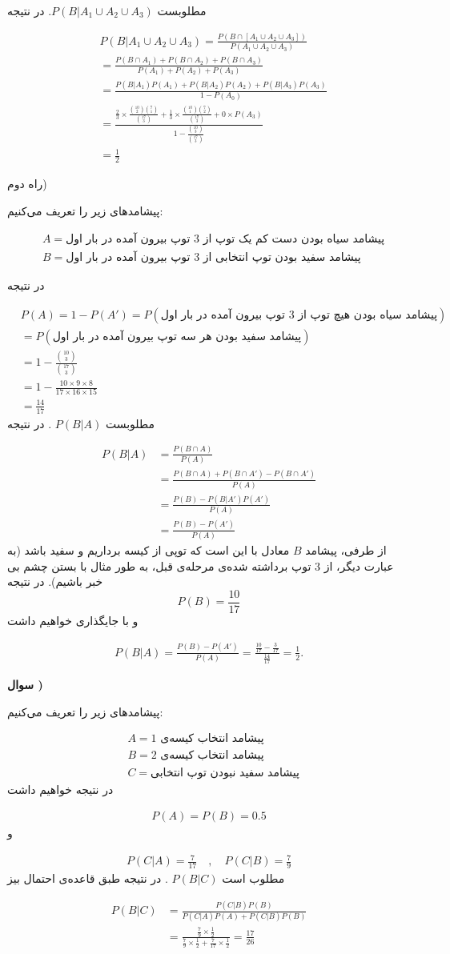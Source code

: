 \documentclass{article}
\newcounter{questionnumber}
\newcommand{\Q}{
\textbf{سوال \thequestionnumber)}
\stepcounter{questionnumber}
}
\newcommand{\eqn}[1]{
\begin{equation}\begin{split}
#1
\end{split}\end{equation}
}
\begin{document}
مطلوبست
$
P(B|A_1\cup A_2\cup A_3)
$.
در نتیجه
\eqn{
&
P(B|A_1\cup A_2\cup A_3)
=
\frac{
P(B\cap[A_1\cup A_2\cup A_3])
}{
P(A_1\cup A_2\cup A_3)
}
\\&=
\frac{
P(B\cap A_1)+P(B\cap A_2)+P(B\cap A_3)
}{
P(A_1)+P(A_2)+P(A_3)
}
\\&=
\frac{
P(B|A_1)P(A_1)+P(B|A_2)P(A_2)+P(B|A_3)P(A_3)
}{
1-P(A_0)
}
\\&=
\frac{
\frac{2}{3}\times \frac{\binom{10}{2}\binom{7}{1}}{\binom{17}{3}}+
\frac{1}{3}\times \frac{\binom{10}{1}\binom{7}{2}}{\binom{17}{3}}+0\times P(A_3)
}{
1-\frac{\binom{10}{3}}{\binom{17}{3}}
}
\\&=\frac{1}{2}
}{}

راه دوم)

پیشامدهای زیر را تعریف می‌کنیم:
\eqn{
&
A=\text{
پیشامد سیاه بودن دست کم یک توپ از 3 توپ بیرون آمده در بار اول
}
\\&
B=\text{
پیشامد سفید بودن توپ انتخابی از 3 توپ بیرون آمده در بار اول
}
}{}

در نتیجه
\eqn{
&P(A)=1-P(A')=P(\text{
پیشامد سیاه بودن هیچ توپ از 3 توپ بیرون آمده در بار اول
})
\\&=
P(\text{
پیشامد سفید بودن هر سه توپ بیرون آمده در بار اول
})
\\&=
1-\frac{\binom{10}{3}}{\binom{17}{3}}
\\&=
1-\frac{10\times 9\times 8}{17\times 16\times 15}
\\&=
\frac{14}{17}
}{}
مطلوبست
$
P(B|A)
$
. در نتیجه
\eqn{
P(B|A)&=\frac{P(B\cap A)}{P(A)}
\\&=\frac{P(B\cap A)+P(B\cap A')-P(B\cap A')}{P(A)}
\\&=\frac{P(B)-P(B|A')P(A')}{P(A)}
\\&=\frac{P(B)-P(A')}{P(A)}
}{}
از طرفی، پیشامد $B$ معادل با این است که توپی از کیسه برداریم و سفید باشد (به عبارت دیگر، از 3 توپ برداشته شده‌ی مرحله‌ی قبل، به طور مثال با بستن چشم بی خبر باشیم). در نتیجه
$$
P(B)=\frac{10}{17}
$$
و با جایگذاری خواهیم داشت
\eqn{
P(B|A)=\frac{P(B)-P(A')}{P(A)}
=\frac{\frac{10}{17}-\frac{3}{17}}{\frac{14}{17}}=\frac{1}{2}.
}{}















\Q

پیشامدهای زیر را تعریف می‌کنیم:
\eqn{
&
A=\text{
پیشامد انتخاب کیسه‌ی 1
}
\\&
B=\text{
پیشامد انتخاب کیسه‌ی 2
}
\\&
C=\text{
پیشامد سفید نبودن توپ انتخابی
}
}{}
در نتیجه خواهیم داشت
\eqn{
P(A)=P(B)=0.5
}{}
و
\eqn{
P(C|A)=\frac{7}{17}\quad,\quad P(C|B)=\frac{7}{9}
}{}
مطلوب است 
$P(B|C)$
. در نتیجه طبق قاعده‌ی احتمال بیز
\eqn{
P(B|C)&=\frac{P(C|B)P(B)}{P(C|A)P(A)+P(C|B)P(B)}
\\&=
\frac{
\frac{7}{9}\times \frac{1}{2}
}{
\frac{7}{9}\times \frac{1}{2}
+
\frac{7}{17}\times \frac{1}{2}
}=\frac{17}{26}
}{}
\end{document}
